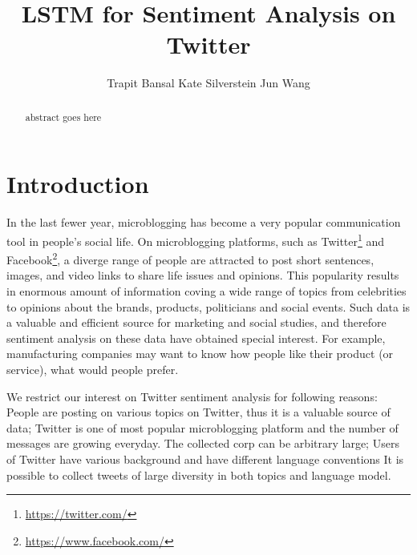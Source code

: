 \documentclass{article} %
\title{LSTM for Sentiment Analysis on Twitter}
\author{
Trapit Bansal
\And
Kate Silverstein
\And
Jun Wang
}
\begin{document}
\maketitle

\begin{abstract}
abstract goes here
\end{abstract}

\section{Introduction}
In the last fewer year, microblogging has become a very popular communication tool in people's social life.
On microblogging platforms, such as Twitter\footnote{\url{https://twitter.com/}} and Facebook\footnote{\url{https://www.facebook.com/}}, a diverge range of people are attracted to post short sentences, images, and video links to share life issues and opinions.
This popularity results in enormous amount of information coving a wide range of topics from celebrities to opinions about the brands, products, politicians and social events. 
Such data is a valuable and efficient source for marketing and social studies, and therefore sentiment analysis on these data have obtained special interest. 
For example, manufacturing companies may want to know how people like their product (or service), what would people prefer.

We restrict our interest on Twitter sentiment analysis for following reasons: 
People are posting on various topics on Twitter, thus it is a valuable source of data; Twitter is one of most popular microblogging platform and the number of messages are growing everyday. The collected corp can be arbitrary large; Users of Twitter have various background and have different language conventions It is possible to collect tweets of large diversity in both topics and language model.
%
\end{document}
